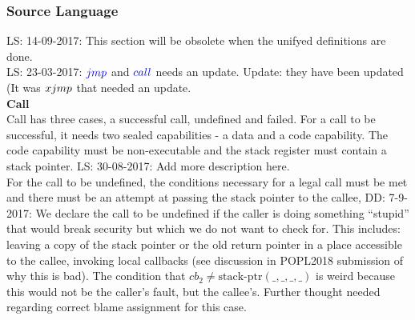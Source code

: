 \documentclass[a4paper]{article}
\newcommand\lau[1]{{\color{purple} \sf \footnotesize {LS: #1}}\\}
\newcommand\dominique[1]{{\color{purple} \sf \footnotesize {DD: #1}}\\}
\newcommand{\sourcecolor}[1]{\color{blue}}
\newcommand{\src}[1]{{\sourcecolor{} #1}}
\newcommand{\targetcolor}[1]{\color{black}}
\newcommand{\trg}[1]{{\targetcolor{} #1}}
\newcommand{\zinstr}[1]{#1}
\newcommand{\oneinstr}[2]{
  \ifthenelse{\equal{#2}{}}
  {\zinstr{#1}}
  {\zinstr{#1} \; #2}
}
\newcommand{\twoinstr}[3]{
  \ifthenelse{\equal{#2#3}{}}
  {\zinstr{#1}}
  {\zinstr{#1} \; #2 \; #3}
}
\newcommand{\sjmp}[1]{\oneinstr{\src{jmp}}{#1}}
\newcommand{\scall}[2]{\twoinstr{\src{call}}{#1}{#2}}
\newcommand{\sxjmp}[2]{\twoinstr{\trg{xjmp}}{#1}{#2}}
\newcommand{\stkptr}[1]{\mathrm{stack\text{-}ptr}(#1)}
\newcommand{\var}[1]{\mathit{#1}}
\newcommand{\cb}{\var{cb}}
\begin{document}
\subsubsection{Source Language}
\label{sec:source-language}
\lau{14-09-2017: This section will be obsolete when the unifyed definitions are done.}
\lau{23-03-2017: $\sjmp{}$ and $\scall{}{}$ needs an update. Update: they have been updated (It was $\sxjmp{}{}$ that needed an update.}

\textbf{Call}\\
Call has three cases, a successful call, undefined and failed. For a call to be successful, it needs two sealed capabilities - a data and a code capability. The code capability must be non-executable and the stack register must contain a stack pointer.
\lau{30-08-2017: Add more description here.}

For the call to be undefined, the conditions necessary for a legal call must be met and there must be an attempt at passing the stack pointer to the callee,
\dominique{7-9-2017: We declare the call to be undefined if the caller is doing something ``stupid'' that would break security but which we do not want to check for.  This includes: leaving a copy of the stack pointer or the old return pointer in a place accessible to the callee, invoking local callbacks (see discussion in POPL2018 submission of why this is bad).  The condition that $\cb_2 \neq \stkptr{\_,\_,\_,\_}$ is weird because this would not be the caller's fault, but the callee's.  Further thought needed regarding correct blame assignment for this case.}
\end{document}
